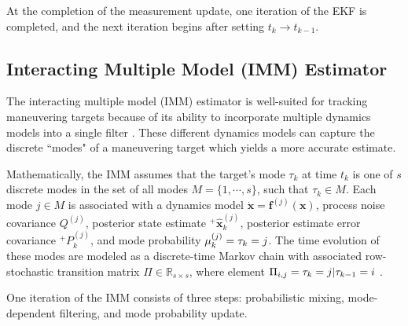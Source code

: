 \documentclass[letterpaper, preprint, paper,11pt]{AAS}	%
\newcommand{\R}{\mathbb{R}}
\let\P\relax\newcommand{\P}[1]{\mathbb{P}\left[#1\right]}
\begin{document}
At the completion of the measurement update, one iteration of the EKF is completed, and the next iteration begins after setting $ t_k \rightarrow t_{k-1}$. 

\subsection{Interacting Multiple Model (IMM) Estimator}

The interacting multiple model (IMM) estimator is well-suited for tracking maneuvering targets because of its ability to incorporate multiple dynamics models into a single filter \cite{blom1988interacting,bar1989tracking,genovese2001interacting}. These different dynamics models can capture the discrete ``modes" of a maneuvering target which yields a more accurate estimate. 

Mathematically, the IMM assumes that the target's mode $\tau_k$ at time $t_k$ is one of $s$ discrete modes in the set of all modes $M = \{1, \cdots, s\}$, such that $\tau_k \in M $. Each mode $j \in M$ is associated with a dynamics model $\dot{\bm{x}} = \bm{f}^{(j)}(\bm{x})$, process noise covariance $Q^{(j)}$, posterior state estimate ${}^+\hat{\bm{x}}_k^{(j)}$, posterior estimate error covariance ${}^+P_k^{(j)}$, and mode probability $\mu^{(j)}_k = \P{\tau_k = j}$. The time evolution of these modes are modeled as a discrete-time Markov chain with associated row-stochastic transition matrix $\Pi \in \R_{s \times s}$, where element $\Pi_{i, j} = \P{\tau_k=j | \tau_{k-1} = i}$ .

One iteration of the IMM consists of three steps: probabilistic mixing, mode-dependent filtering, and mode probability update.
\end{document}
